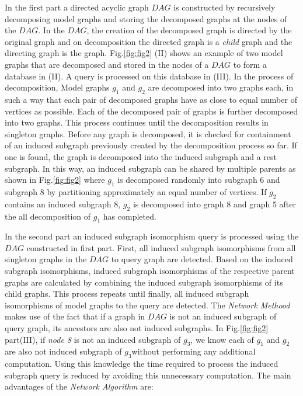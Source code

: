 In the first part a directed acyclic graph $DAG$ is constructed by recursively decomposing model graphs and storing the decomposed graphs at the nodes of the $DAG$.
In the $DAG$, the creation of the decomposed graph is directed by the original graph and on decomposition the directed graph is a \textit{child} graph and the directing graph is the  graph. 
Fig.\ref{fig:fig2} (II) shows an example of two model graphs that are decomposed and stored in the nodes of a $DAG$ to form a database in (II). A query is processed on this database in (III).
In the process of decomposition, Model graphs $g_1$ and $g_2$ are decomposed into two graphs each, in such a way that each pair of decomposed graphs have as close to equal number of vertices  as possible.
Each of the decomposed pair of graphs is further decomposed into two graphs.
This process continues until the decomposition results in singleton graphs.
Before any graph is decomposed, it is checked for containment of an induced subgraph previously created by the decomposition process so far. If one is found, the graph is decomposed into the induced subgraph and a rest subgraph. In this way, an induced subgraph can be shared by multiple parents as shown in Fig.\ref{fig:fig2} where $g_1$ is decomposed randomly into subgraph $6$ and subgraph $8$ by partitioning approximately an equal number of vertices.
If $g_2$ contains an induced subgraph $8$, $g_2$ is decomposed into graph $8$ and graph $5$ after the all decomposition of $g_1$ has completed.

In the second part an induced subgraph isomorphism query is processed using the $DAG$ constructed in first part.
First, all induced subgraph isomorphisms from all singleton graphs in the $DAG$ to query graph are detected.
Based on the induced subgraph isomorphisms, induced subgraph isomorphisms of the respective parent graphs are calculated by combining the induced subgraph isomorphisms of its child graphs. This process repeats until finally, all induced subgraph isomorphisms of model graphs to the query are detected.
The \textit{Network Methood} makes use of the fact that if a graph in $DAG$ is not an induced subgraph of query graph, its ancestors are also not induced subgraphs.
In Fig.\ref{fig:fig2} part(III), if \textit{node 8} is not an induced subgraph of $g_3$, we know each of $g_1$ and $g_2$ are also not induced subgraph of $g_3$without performing any additional computation. Using this knowledge the time required to process the induced subgraph query is reduced by avoiding this unnecessary computation. The main advantages of the \textit{Network Algorithm}  are:  

